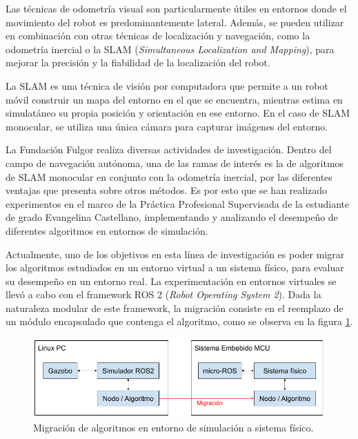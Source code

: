 \documentclass[
11pt, %
codirector, %
]{charter}
\begin{document}
Las técnicas de odometría visual son particularmente útiles en entornos donde el movimiento del robot es predominantemente lateral. Además, se pueden utilizar en combinación con otras técnicas de localización y navegación, como la odometría inercial o la SLAM (\textit{Simultaneous Localization and Mapping}), para mejorar la precisión y la fiabilidad de la localización del robot.

La SLAM es una técnica de visión por computadora que permite a un robot móvil construir un mapa del entorno en el que se encuentra, mientras estima en simulatáneo su propia posición y orientación en ese entorno. En el caso de SLAM monocular, se utiliza una única cámara para capturar imágenes del entorno.

La Fundación Fulgor realiza diversas actividades de investigación. Dentro del campo de navegación autónoma, una de las ramas de interés es la de algoritmos de SLAM monocular en conjunto con la odometría inercial, por las diferentes ventajas que presenta sobre otros métodos. Es por esto que se han realizado experimentos en el marco de la Práctica Profesional Supervisada de la estudiante de grado Evangelina Castellano, implementando y analizando el desempeño de diferentes algoritmos en entornos de simulación.

Actualmente, uno de los objetivos en esta línea de investigación es poder migrar los algoritmos estudiados en un entorno virtual a un sistema físico, para evaluar su desempeño en un entorno real. La experimentación en entornos virtuales se llevó a cabo con el framework ROS 2 (\textit{Robot Operating System 2}).
Dada la naturaleza modular de este framework, la migración consiste en el reemplazo de un módulo encapsulado que contenga el algoritmo, como se observa en la figura \ref{fig:ros2-to-microros}. 

\begin{figure}[htpb]
\centering 
\includegraphics[width=.8\textwidth]{./Figuras/ros2-microros-migration.png}
\caption{Migración de algoritmos en entorno de simulación a sistema físico.}
\label{fig:ros2-to-microros}
\end{figure}

\end{document}
